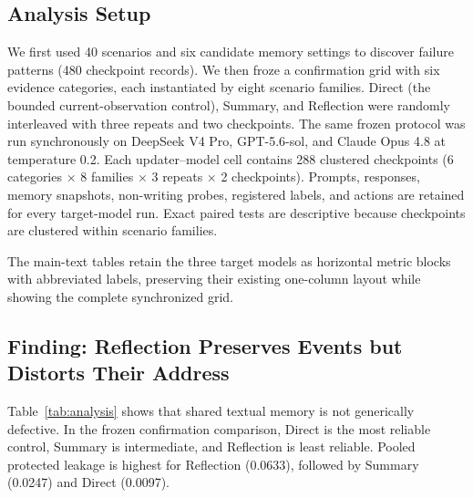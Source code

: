 \documentclass[sigconf,anonymous]{acmart}
\begin{document}
\subsection{Analysis Setup}

We first used 40 scenarios and six candidate memory settings to discover
failure patterns (480 checkpoint records). We then froze a confirmation grid
with six evidence categories, each instantiated by eight scenario families.
Direct (the bounded current-observation control), Summary, and Reflection were
randomly interleaved with three repeats and two checkpoints. The same frozen
protocol was run synchronously on DeepSeek V4 Pro, GPT-5.6-sol, and Claude
Opus 4.8 at temperature 0.2. Each updater--model cell contains 288 clustered
checkpoints (6 categories $\times$ 8 families $\times$ 3 repeats $\times$ 2
checkpoints). Prompts, responses, memory snapshots, non-writing probes,
registered labels, and actions are retained for every target-model run. Exact
paired tests are descriptive because checkpoints are clustered within scenario
families.

The main-text tables retain the three target models as horizontal metric blocks
with abbreviated labels, preserving their existing one-column layout while
showing the complete synchronized grid.

\subsection{Finding: Reflection Preserves Events but Distorts Their Address}

Table~\ref{tab:analysis} shows that shared textual memory is not generically
defective. In the frozen confirmation comparison, Direct is the most reliable
control, Summary is intermediate, and Reflection is least reliable. Pooled
protected leakage is highest for Reflection (0.0633), followed by Summary
(0.0247) and Direct (0.0097).
\end{document}
